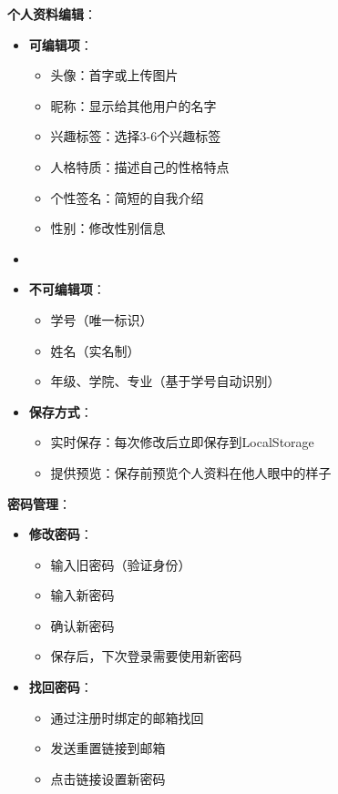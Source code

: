 \documentclass[12pt,a4paper]{article}
\begin{document}
\textbf{个人资料编辑}：
\begin{itemize}
    \item \textbf{可编辑项}：
        \begin{itemize}
            \item 头像：首字或上传图片
            \item 昵称：显示给其他用户的名字
            \item 兴趣标签：选择3-6个兴趣标签
            \item 人格特质：描述自己的性格特点
            \item 个性签名：简短的自我介绍
            \item 性别：修改性别信息
        \end{itemize}
    \item \item \textbf{不可编辑项}：
        \begin{itemize}
            \item 学号（唯一标识）
            \item 姓名（实名制）
            \item 年级、学院、专业（基于学号自动识别）
        \end{itemize}
    \item \textbf{保存方式}：
        \begin{itemize}
            \item 实时保存：每次修改后立即保存到LocalStorage
            \item 提供预览：保存前预览个人资料在他人眼中的样子
        \end{itemize}
\end{itemize}

\textbf{密码管理}：
\begin{itemize}
    \item \textbf{修改密码}：
        \begin{itemize}
            \item 输入旧密码（验证身份）
            \item 输入新密码
            \item 确认新密码
            \item 保存后，下次登录需要使用新密码
        \end{itemize}
    \item \textbf{找回密码}：
        \begin{itemize}
            \item 通过注册时绑定的邮箱找回
            \item 发送重置链接到邮箱
            \item 点击链接设置新密码
        \end{itemize}
\end{itemize}
\end{document}
